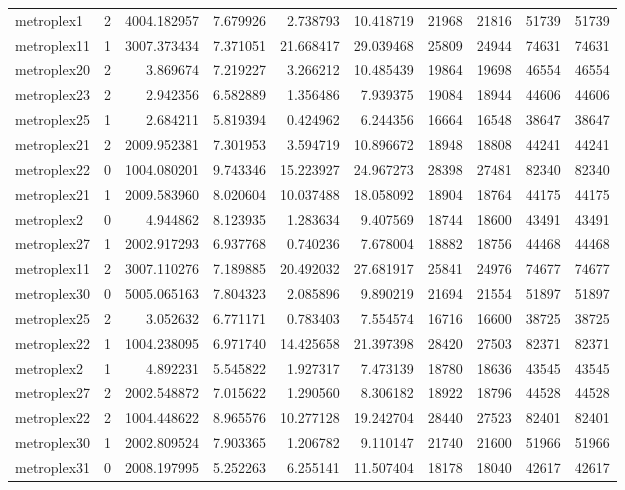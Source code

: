 \begin{longtable}{|l|r|r|r|r|r|r|r|r|r|}
metroplex1 & 2 & 4004.182957 & 7.679926 & 2.738793 & 10.418719 & 21968 & 21816 & 51739 & 51739 \\
metroplex11 & 1 & 3007.373434 & 7.371051 & 21.668417 & 29.039468 & 25809 & 24944 & 74631 & 74631 \\
metroplex20 & 2 & 3.869674 & 7.219227 & 3.266212 & 10.485439 & 19864 & 19698 & 46554 & 46554 \\
metroplex23 & 2 & 2.942356 & 6.582889 & 1.356486 & 7.939375 & 19084 & 18944 & 44606 & 44606 \\
metroplex25 & 1 & 2.684211 & 5.819394 & 0.424962 & 6.244356 & 16664 & 16548 & 38647 & 38647 \\
metroplex21 & 2 & 2009.952381 & 7.301953 & 3.594719 & 10.896672 & 18948 & 18808 & 44241 & 44241 \\
metroplex22 & 0 & 1004.080201 & 9.743346 & 15.223927 & 24.967273 & 28398 & 27481 & 82340 & 82340 \\
metroplex21 & 1 & 2009.583960 & 8.020604 & 10.037488 & 18.058092 & 18904 & 18764 & 44175 & 44175 \\
metroplex2 & 0 & 4.944862 & 8.123935 & 1.283634 & 9.407569 & 18744 & 18600 & 43491 & 43491 \\
metroplex27 & 1 & 2002.917293 & 6.937768 & 0.740236 & 7.678004 & 18882 & 18756 & 44468 & 44468 \\
metroplex11 & 2 & 3007.110276 & 7.189885 & 20.492032 & 27.681917 & 25841 & 24976 & 74677 & 74677 \\
metroplex30 & 0 & 5005.065163 & 7.804323 & 2.085896 & 9.890219 & 21694 & 21554 & 51897 & 51897 \\
metroplex25 & 2 & 3.052632 & 6.771171 & 0.783403 & 7.554574 & 16716 & 16600 & 38725 & 38725 \\
metroplex22 & 1 & 1004.238095 & 6.971740 & 14.425658 & 21.397398 & 28420 & 27503 & 82371 & 82371 \\
metroplex2 & 1 & 4.892231 & 5.545822 & 1.927317 & 7.473139 & 18780 & 18636 & 43545 & 43545 \\
metroplex27 & 2 & 2002.548872 & 7.015622 & 1.290560 & 8.306182 & 18922 & 18796 & 44528 & 44528 \\
metroplex22 & 2 & 1004.448622 & 8.965576 & 10.277128 & 19.242704 & 28440 & 27523 & 82401 & 82401 \\
metroplex30 & 1 & 2002.809524 & 7.903365 & 1.206782 & 9.110147 & 21740 & 21600 & 51966 & 51966 \\
metroplex31 & 0 & 2008.197995 & 5.252263 & 6.255141 & 11.507404 & 18178 & 18040 & 42617 & 42617 \\

\end{longtable}
